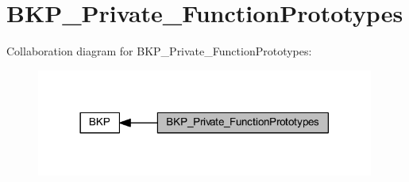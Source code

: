 \hypertarget{group___b_k_p___private___function_prototypes}{}\section{B\+K\+P\+\_\+\+Private\+\_\+\+Function\+Prototypes}
\label{group___b_k_p___private___function_prototypes}
Collaboration diagram for B\+K\+P\+\_\+\+Private\+\_\+\+Function\+Prototypes\+:
\nopagebreak
\begin{figure}[H]
\begin{center}
\leavevmode
\includegraphics[width=314pt]{group___b_k_p___private___function_prototypes}
\end{center}
\end{figure}
